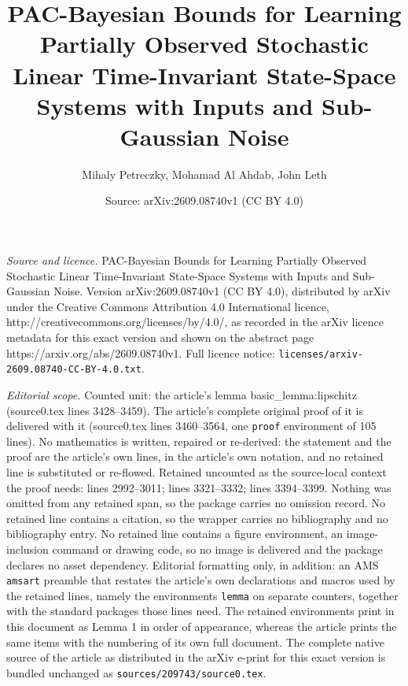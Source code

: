\documentclass[10pt,a4paper]{amsart}
\title{PAC-Bayesian Bounds for Learning Partially Observed Stochastic Linear Time-Invariant State-Space Systems with Inputs and Sub-Gaussian Noise}
\author{Mihaly Petreczky, Mohamad Al Ahdab, John Leth}
\date{Source: arXiv:2609.08740v1 (CC BY 4.0)}
\begin{document}
\maketitle

\noindent\emph{Source and licence.} PAC-Bayesian Bounds for Learning Partially Observed Stochastic Linear Time-Invariant State-Space Systems with Inputs and Sub-Gaussian Noise. Version arXiv:2609.08740v1 (CC BY 4.0), distributed by arXiv under the Creative Commons Attribution 4.0 International licence, http://creativecommons.org/licenses/by/4.0/, as recorded in the arXiv licence metadata for this exact version and shown on the abstract page https://arxiv.org/abs/2609.08740v1. Full licence notice: \texttt{licenses/arxiv-2609.08740-CC-BY-4.0.txt}.\par\smallskip

\noindent\textit{Editorial scope.} Counted unit: the article's lemma basic\_lemma:lipschitz (source0.tex lines 3428--3459). The article's complete original proof of it is delivered with it (source0.tex lines 3460--3564, one \texttt{proof} environment of 105 lines). No mathematics is written, repaired or re-derived: the statement and the proof are the article's own lines, in the article's own notation, and no retained line is substituted or re-flowed.  Retained uncounted as the source-local context the proof needs: lines 2992--3011; lines 3321--3332; lines 3394--3399.  Nothing was omitted from any retained span, so the package carries no omission record.  No retained line contains a citation, so the wrapper carries no bibliography and no bibliography entry.  No retained line contains a figure environment, an image-inclusion command or drawing code, so no image is delivered and the package declares no asset dependency.  Editorial formatting only, in addition: an AMS \texttt{amsart} preamble that restates the article's own declarations and macros used by the retained lines, namely the environments \texttt{lemma} on separate counters, together with the standard packages those lines need.  The retained environments print in this document as Lemma 1 in order of appearance, whereas the article prints the same items with the numbering of its own full document.  The complete native source of the article as distributed in the arXiv e-print for this exact version is bundled unchanged as \texttt{sources/209743/source0.tex}.
\end{document}
